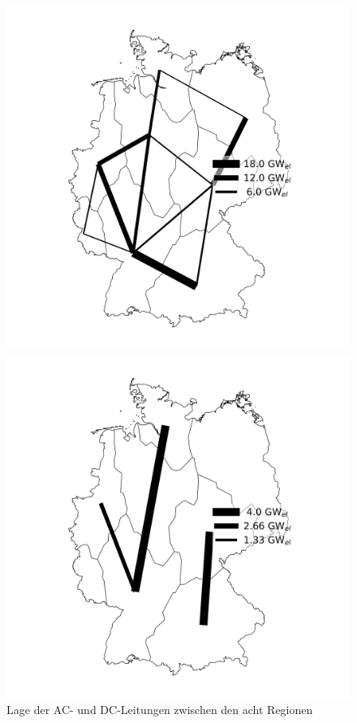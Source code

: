 \begin{figure}[!h]
    \begin{minipage}[b]{.4\linewidth} 
       \includegraphics[width=\linewidth]{images/AC-insgesamt.png}
    \end{minipage}
    \hspace{.1\linewidth}
    \begin{minipage}[b]{.4\linewidth} 
       \includegraphics[width=\linewidth]{images/DC-insgesamt.png}
    \end{minipage}
    \caption{Lage der AC- und DC-Leitungen zwischen den acht Regionen}
    \label{image:Leitungen}
  \end{figure}


